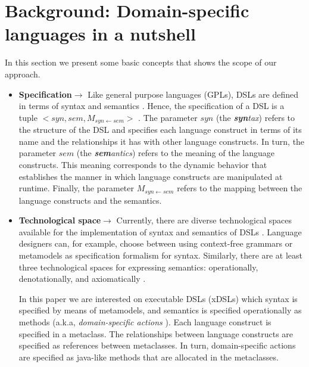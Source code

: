 \section{Background: Domain-specific languages in a nutshell}
\label{sec:background}
In this section we present some basic concepts that shows the scope of our approach.  
\begin{itemize}


\item{\textbf{Specification$\rightarrow$}} Like general purpose languages (GPLs), DSLs are defined in terms of syntax and semantics \cite{Harel:2004b}. Hence, the specification of a DSL is a tuple $<syn,sem,M_{syn\leftarrow sem}>$ \cite{Combemale:2013}. The parameter $syn$ (the \textit{\textbf{syn}tax}) refers to the structure of the DSL and specifies each language construct in terms of its name and the relationships it has with other language constructs. In turn, the parameter $sem$ (the \textit{\textbf{sem}antics}) refers to the meaning of the language constructs. This meaning corresponds to the dynamic behavior that establishes the manner in which language constructs are manipulated at runtime. Finally, the parameter $M_{syn\leftarrow sem}$ refers to the mapping between the language constructs and the semantics. 
 
\item{\textbf{Technological space$\rightarrow$}} Currently, there are diverse technological spaces available for the implementation of syntax and semantics of DSLs \cite{Mernik:2005b}. Language designers can, for example, choose between using context-free grammars or metamodels as specification formalism for syntax. Similarly, there are at least three technological spaces for expressing semantics: operationally, denotationally, and axiomatically \cite{Mosses:2001}.

In this paper we are interested on executable DSLs (xDSLs) which syntax is specified by means of metamodels, and semantics is specified operationally as methods (a.k.a, \textit{domain-specific actions} \cite{Combemale:2013}). Each language construct is specified in a metaclass. The relationships between language constructs are specified as references between metaclasses. In turn, domain-specific actions are specified as java-like methods that are allocated in the metaclasses.
 

\end{itemize}
